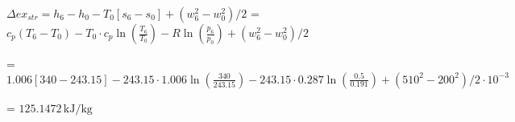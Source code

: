 \( \Delta ex_{str} = h_6 - h_0 - T_0 [s_6 - s_0] + (w_6^2 - w_0^2)/2 \)  
= \( c_p (T_6 - T_0) - T_0 \cdot c_p \ln \left( \frac{T_6}{T_0} \right) - R \ln \left( \frac{p_6}{p_0} \right) + (w_6^2 - w_0^2)/2 \)  

= \( 1.006 [340 - 243.15] - 243.15 \cdot 1.006 \ln \left( \frac{340}{243.15} \right) - 243.15 \cdot 0.287 \ln \left( \frac{0.5}{0.191} \right) + (510^2 - 200^2)/2 \cdot 10^{-3} \)  

= \( 125.1472 \, \text{kJ/kg} \)
